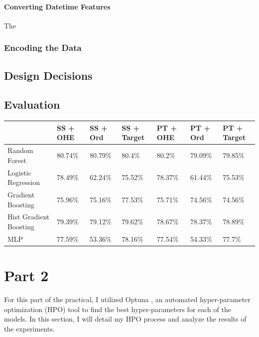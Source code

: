 \documentclass{article}
\begin{document}
\paragraph{Converting Datetime Features}
The

\subsubsection{Encoding the Data}

\subsection{Design Decisions}

\subsection{Evaluation}

\begin{table}[]
\begin{tabular}{|l|l|l|l|l|l|l|}
\hline
\textbf{}              & SS + OHE & SS + Ord & SS + Target & PT + OHE & PT + Ord & PT + Target \\ \hline
Random Forest          & 80.74\%  & 80.79\%  & 80.4\%      & 80.2\%   & 79.09\%  & 79.85\%     \\ \hline
Logistic Regression    & 78.49\%  & 62.24\%  & 75.52\%     & 78.37\%  & 61.44\%  & 75.53\%     \\ \hline
Gradient Boosting      & 75.96\%  & 75.16\%  & 77.53\%     & 75.71\%  & 74.56\%  & 74.56\%     \\ \hline
Hist Gradient Boosting & 79.39\%  & 79.12\%  & 79.62\%     & 78.67\%  & 78.37\%  & 78.89\%     \\ \hline
MLP                    & 77.59\%  & 53.36\%  & 78.16\%     & 77.54\%  & 54.33\%  & 77.7\%      \\ \hline
\end{tabular}
\end{table}

\section{Part 2}
For this part of the practical, I utilized Optuna \cite{optuna_2019}, an automated hyper-parameter optimization (HPO) tool to find the best hyper-parameters for each of the models. In this section, I will detail my HPO process and analyze the results of the experiments.
\end{document}
